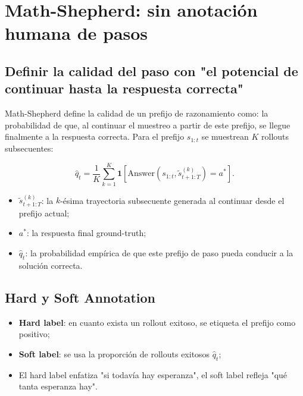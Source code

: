 \section{Math-Shepherd: sin anotación humana de pasos}

\subsection{Definir la calidad del paso con "el potencial de continuar hasta la respuesta correcta"}

Math-Shepherd define la calidad de un prefijo de razonamiento como: la probabilidad de que, al continuar el muestreo a partir de este prefijo, se llegue finalmente a la respuesta correcta. Para el prefijo $s_{1:t}$ se muestrean $K$ rollouts subsecuentes:

$$
\hat q_t=\frac{1}{K}\sum_{k=1}^{K}
\mathbf 1\!\left[\mathrm{Answer}(s_{1:t},\tilde s^{(k)}_{t+1:T})=a^*\right].
$$

\begin{itemize}
    \item $\tilde s^{(k)}_{t+1:T}$: la $k$-ésima trayectoria subsecuente generada al continuar desde el prefijo actual;
    \item $a^*$: la respuesta final ground-truth;
    \item $\hat q_t$: la probabilidad empírica de que este prefijo de paso pueda conducir a la solución correcta.
\end{itemize}


\subsection{Hard y Soft Annotation}

\begin{itemize}
    \item \textbf{Hard label}: en cuanto exista un rollout exitoso, se etiqueta el prefijo como positivo;
    \item \textbf{Soft label}: se usa la proporción de rollouts exitosos $\hat q_t$;
    \item El hard label enfatiza "si todavía hay esperanza", el soft label refleja "qué tanta esperanza hay".
\end{itemize}

